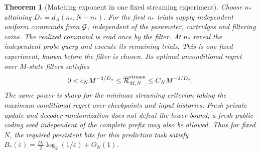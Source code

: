 \documentclass[11pt]{amsart}
\newtheorem{theorem}{Theorem}[section]
\theoremstyle{definition}\newtheorem{definition}[theorem]{Definition}
\theoremstyle{remark}\newtheorem{remark}[theorem]{Remark}
\begin{document}
\begin{theorem}[Matching exponent in one fixed streaming experiment]\label{thm:stream-lower}
Choose $n_*$ attaining $D_*=d_A(n_*,N-n_*)$. For the first $n_*$ trials
supply independent uniform commands from $\mathcal G$, independent of the
parameter, cartridges and filtering coins. The realized command is read
once by the filter. At $n_*$ reveal the independent probe query and execute
its remaining trials. This is one fixed experiment, known before the
filter is chosen. Its optimal unconditional regret over $M$-state filters
satisfies
\begin{equation}\label{eq:stream-match}
 0<c_NM^{-2/D_*}\le\overline{\mathcal R}_{M,N}^{\rm stream}
                  \le C_NM^{-2/D_*}.
\end{equation}
The same power is sharp for the minimax streaming criterion taking the
maximum conditional regret over checkpoints and input histories. Fresh
private update and decoder randomization does not defeat the lower bound;
a fresh public coding seed independent of the complete prefix may also be
allowed. Thus for fixed $N$, the required persistent bits for this prediction
task satisfy
$B_*(\varepsilon)=\tfrac{D_*}{2}\log_2(1/\varepsilon)+O_N(1)$.
\end{theorem}
\end{document}
